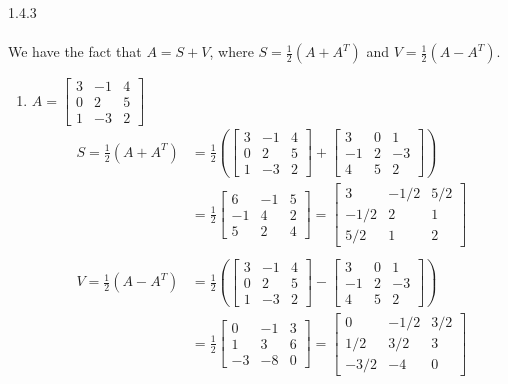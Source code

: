 \documentclass{article}
\theoremstyle{definition}
\begin{document}
	\begin{prob}{1.4.3} $  $ \\ \\
		We have the fact that $ A = S + V $, where $ S = \frac{1}{2}(A+A^T) $ and $ V = \frac{1}{2}(A-A^T) $.
		\begin{enumerate}[label=(\alph*)]
			\item $ A = \begin{bmatrix} 3 & -1 & 4 \\ 0 & 2 & 5 \\ 1 & -3 & 2 \end{bmatrix} $
				\begin{align*}
					S = \frac{1}{2}(A+A^T) &= \frac{1}{2} \left( \begin{bmatrix} 3 & -1 & 4 \\ 0 & 2 & 5 \\ 1 & -3 & 2 \end{bmatrix} + \begin{bmatrix} 3 & 0 & 1 \\ -1 & 2 & -3 \\ 4 & 5 & 2 \end{bmatrix} \right) \\
					&= \frac{1}{2} \begin{bmatrix} 6 & -1 & 5 \\ -1 & 4 & 2 \\ 5 & 2 & 4 \end{bmatrix}
					= \begin{bmatrix} 3 & -1/2 & 5/2 \\ -1/2 & 2 & 1 \\ 5/2 & 1 & 2 \end{bmatrix} \\ \\
					V = \frac{1}{2}(A-A^T) &= \frac{1}{2} \left( \begin{bmatrix} 3 & -1 & 4 \\ 0 & 2 & 5 \\ 1 & -3 & 2 \end{bmatrix} - \begin{bmatrix} 3 & 0 & 1 \\ -1 & 2 & -3 \\ 4 & 5 & 2 \end{bmatrix} \right) \\
					&= \frac{1}{2} \begin{bmatrix} 0 & -1 & 3 \\ 1 & 3 & 6 \\ -3 & -8 & 0 \end{bmatrix} = \begin{bmatrix} 0 & -1/2 & 3/2 \\ 1/2 & 3/2 & 3 \\ -3/2 & -4 & 0 \end{bmatrix}

\end{align*}
\end{enumerate}
\end{prob}
\end{document}
